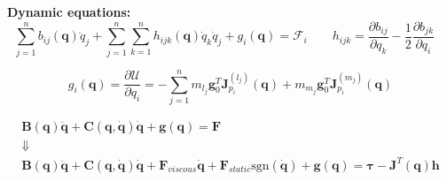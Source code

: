 \vspace*{10pt}
\textbf{Dynamic equations: }
$$
\sum_{j=1}^n b_{ij}(\bm{q}) \ddot{q}_j
+
\sum_{j=1}^n \sum_{k=1}^n h_{ijk} (\bm{q}) \dot{q}_k \dot{q}_j 
+
g_i(\bm{q})
=
\mathcal{F}_i
\qquad
h_{ijk}
=
\frac{\partial b_{ij}}{\partial q_k}
-
\frac{1}{2} \frac{\partial b_{jk}}{\partial q_i}
\quad
$$

$$
g_i(\bm{q})
=
\frac{\partial \mathcal{U}}{\partial q_i}
=
-\sum_{j=1}^n m_{l_j}\bm{g}_0^T \bm{J}^{(l_j)}_{p_i}(\bm{q}) + m_{m_j}\bm{g}_0^T  \bm{J}^{(m_j)}_{p_i}(\bm{q})
$$

\vspace*{5pt}
\begin{gather*}
\bm{B}(\bm{q})\bm{\ddot{q}} + \bm{C}(\bm{q}, \bm{\dot{q}})\bm{\dot{q}} + \bm{g}(\bm{q})= \mathcal{\bm{F}} \\
\Downarrow \\
\bm{B}(\bm{q})\bm{\ddot{q}} + \bm{C}(\bm{q}, \bm{\dot{q}})\bm{\dot{q}} +
\bm{F}_{viscous}\dot{\bm{q}} 
+
\bm{F}_{static} \text{sgn}(\dot{\bm{q}})
+
\bm{g}(\bm{q})
= 
\bm{\tau}
-
\bm{J}^T(\bm{q}) \bm{h}
\end{gather*}
\vspace{-5pt}
